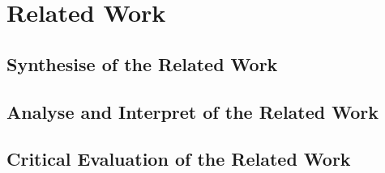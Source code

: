 
\section{Related Work}
	\label{sec:related_work}


	\subsection{Synthesise of the Related Work}
	
	
	
	\subsection{Analyse and Interpret of the Related Work}
	
	
	
	\subsection{Critical Evaluation of the Related Work}

